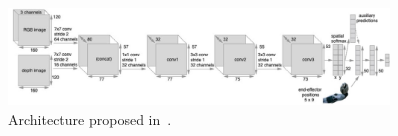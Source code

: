 \begin{figure}[bt]
    \centering
    \includegraphics[width=0.9\textwidth]{figures/images/deep_imitation_bc/deep_imitation_bc.jpg}
    \caption{Architecture proposed in~\cite{zhang2018deep_vr_teleoperation}.}
    \label{fig:deep_bc}
\end{figure}
